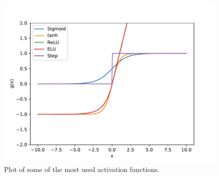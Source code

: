 \begin{figure}
    \centering
    \includegraphics[width=\textwidth,height=\textheight,keepaspectratio]{pics/act_func_fig.pdf}
    \caption{Plot of some of the most used activation functions.}
    \label{fig:act_funcs}
\end{figure}


